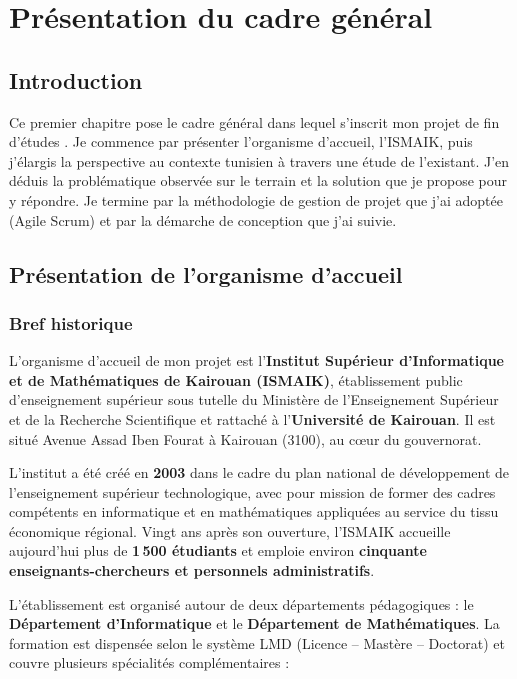 \chapter{Présentation du cadre général}

\section{Introduction}
Ce premier chapitre pose le cadre général dans lequel s'inscrit mon
projet de fin d'études \nova. Je commence par présenter l'organisme
d'accueil, l'ISMAIK, puis j'élargis la perspective au contexte
tunisien à travers une étude de l'existant. J'en déduis la
problématique observée sur le terrain et la solution que je propose
pour y répondre. Je termine par la méthodologie de gestion de
projet que j'ai adoptée (Agile Scrum) et par la démarche de
conception que j'ai suivie.

\section{Présentation de l'organisme d'accueil}

\subsection{Bref historique}
L'organisme d'accueil de mon projet est l'\textbf{Institut Supérieur
d'Informatique et de Mathématiques de Kairouan (ISMAIK)},
établissement public d'enseignement supérieur sous tutelle du
Ministère de l'Enseignement Supérieur et de la Recherche
Scientifique et rattaché à l'\textbf{Université de Kairouan}. Il est
situé Avenue Assad Iben Fourat à Kairouan (3100), au cœur du
gouvernorat.

L'institut a été créé en \textbf{2003} dans le cadre du plan
national de développement de l'enseignement supérieur technologique,
avec pour mission de former des cadres compétents en informatique et
en mathématiques appliquées au service du tissu économique régional.
Vingt ans après son ouverture, l'ISMAIK accueille aujourd'hui
plus de \textbf{1\,500 étudiants} et emploie environ
\textbf{cinquante enseignants-chercheurs et personnels administratifs}.

L'établissement est organisé autour de deux départements
pédagogiques : le \textbf{Département d'Informatique} et le
\textbf{Département de Mathématiques}. La formation est dispensée
selon le système LMD (Licence -- Mastère -- Doctorat) et couvre
plusieurs spécialités complémentaires :

